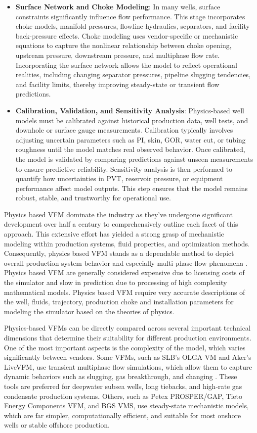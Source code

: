 \documentclass[12pt,APA]{uomthesis}
\begin{document}
\begin{itemize}
    \item \textbf{Surface Network and Choke Modeling}:
    In many wells, surface constraints significantly influence flow performance. This stage incorporates choke models, manifold pressures, flowline hydraulics, separators, and facility back-pressure effects. Choke modeling uses vendor-specific or mechanistic equations to capture the nonlinear relationship between choke opening, upstream pressure, downstream pressure, and multiphase flow rate. Incorporating the surface network allows the model to reflect operational realities, including changing separator pressures, pipeline slugging tendencies, and facility limits, thereby improving steady-state or transient flow predictions.
    \item \textbf{Calibration, Validation, and Sensitivity Analysis}:
    Physics-based well models must be calibrated against historical production data, well tests, and downhole or surface gauge measurements. Calibration typically involves adjusting uncertain parameters such as PI, skin, GOR, water cut, or tubing roughness until the model matches real observed behavior. Once calibrated, the model is validated by comparing predictions against unseen measurements to ensure predictive reliability. Sensitivity analysis is then performed to quantify how uncertainties in PVT, reservoir pressure, or equipment performance affect model outputs. This step ensures that the model remains robust, stable, and trustworthy for operational use.
\end{itemize} 


Physics based VFM dominate the industry as they've undergone significant development over half a century to comprehensively outline each facet of this approach. This extensive effort has yielded a strong grasp of mechanistic modeling within production systems, fluid properties, and optimization methods. Consequently, physics based VFM stands as a dependable method to depict overall production system behavior and especially multi-phase flow phenomena \citep{bikmukhametov2020first}. Physics based VFM are generally considered expensive due to licensing costs of the simulator and slow in prediction due to processing of high complexity mathematical models. Physics based VFM require very accurate descriptions of the well, fluids, trajectory, production choke and installation parameters for modeling the simulator based on the theories of physics. 

Physics-based VFMs can be directly compared across several important technical dimensions that determine their suitability for different production environments. One of the most important aspects is the complexity of the model, which varies significantly between vendors. Some VFMs, such as SLB's OLGA VM and Aker's LiveVFM, use transient multiphase flow simulations, which allow them to capture dynamic behaviors such as slugging, gas breakthrough, and changing . These tools are preferred for deepwater subsea wells, long tiebacks, and high-rate gas condensate production systems. Others, such as Petex PROSPER/GAP, Tieto Energy Components VFM, and BGS VMS, use steady-state mechanistic models, which are far simpler, computationally efficient, and suitable for most onshore wells or stable offshore production.
\end{document}
